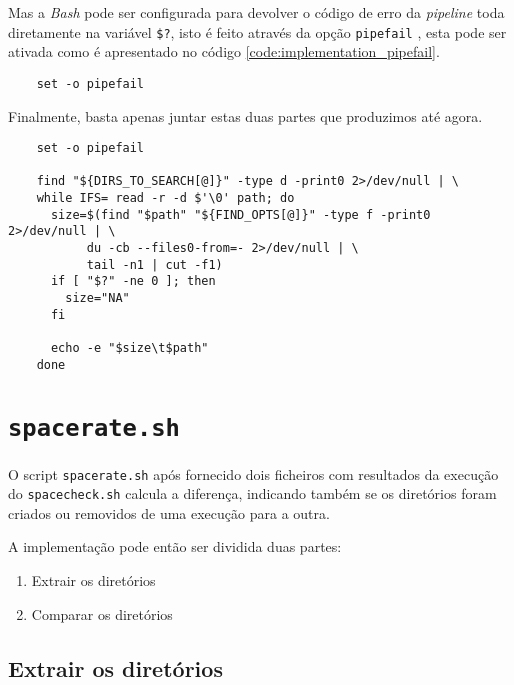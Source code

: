 Mas a \emph{Bash} pode ser configurada para devolver o código de erro da
\emph{pipeline} toda diretamente na variável \Verb|$?|, isto é feito através da
opção \Verb|pipefail| \cite{bash_man}, esta pode ser ativada como é apresentado
no código \ref{code:implementation_pipefail}.

\begin{listing}[H]
	\centering
	\begin{verbatim}
    set -o pipefail
  \end{verbatim}
	\cprotect\caption{Ativação da opção \Verb|pipefail|}
	\label{code:implementation_pipefail}
\end{listing}

Finalmente, basta apenas juntar estas duas partes que produzimos até agora.

\begin{listing}[H]
	\centering
	\begin{verbatim}
    set -o pipefail

    find "${DIRS_TO_SEARCH[@]}" -type d -print0 2>/dev/null | \
    while IFS= read -r -d $'\0' path; do
      size=$(find "$path" "${FIND_OPTS[@]}" -type f -print0  2>/dev/null | \
           du -cb --files0-from=- 2>/dev/null | \
           tail -n1 | cut -f1)
      if [ "$?" -ne 0 ]; then
        size="NA"
      fi

      echo -e "$size\t$path"
    done
  \end{verbatim}
	\cprotect\caption{Implementação do algoritmo principal do \Verb|spacecheck.sh|}
\end{listing}

\cprotect\section{\Verb|spacerate.sh|}

O script \Verb|spacerate.sh| após fornecido dois ficheiros com resultados da
execução do \Verb|spacecheck.sh| calcula a diferença, indicando também se os
diretórios foram criados ou removidos de uma execução para a outra.

A implementação pode então ser dividida duas partes:

\begin{enumerate}
	\item Extrair os diretórios
	\item Comparar os diretórios
\end{enumerate}

\subsection{Extrair os diretórios}

